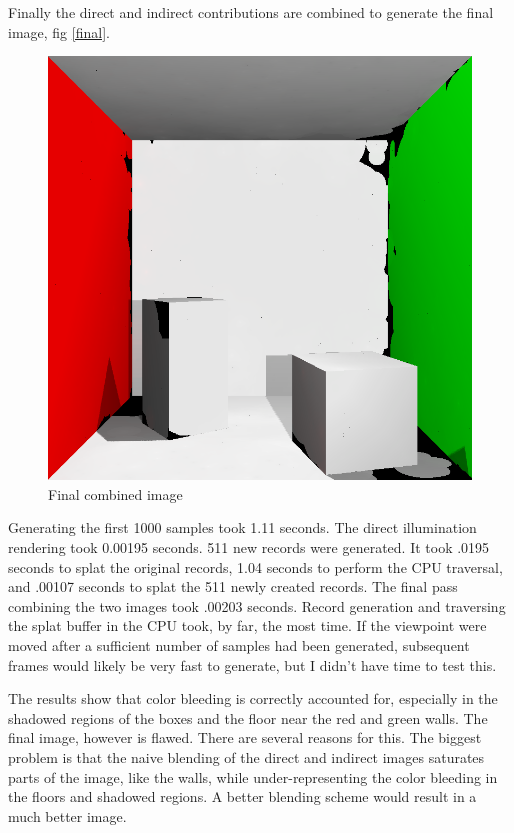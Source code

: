 \documentclass[10pt,twopage]{acmsiggraph}
\begin{document}
Finally the direct and indirect contributions are combined to generate the final image, fig \ref{final}.

\begin{figure}[htbp]
\begin{center}
\includegraphics[scale = .3]{finalResult.png}
\caption{Final combined image}
\label{direct}
\end{center}
\end{figure}

Generating the first 1000 samples took 1.11 seconds.  The direct illumination rendering took 0.00195 seconds.  511 new records were generated.  It took .0195 seconds to splat the original records, 1.04 seconds to perform the CPU traversal, and .00107 seconds to splat the 511 newly created records.  The final pass combining the two images took .00203 seconds.  Record generation and traversing the splat buffer in the CPU took, by far, the most time.  If the viewpoint were moved after a sufficient number of samples had been generated, subsequent frames would likely be very fast to generate, but I didn't have time to test this.

The results show that color bleeding is correctly accounted for, especially in the shadowed regions of the boxes and the floor near the red and green walls.  The final image, however is flawed.  There are several reasons for this.  The biggest problem is that the naive blending of the direct and indirect images saturates parts of the image, like the walls, while under-representing the color bleeding in the floors and shadowed regions.  A better blending scheme would result in a much better image.
\end{document}
